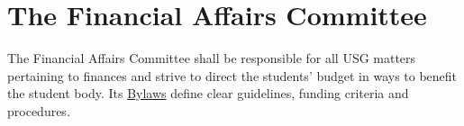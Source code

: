 \section{The Financial Affairs Committee}
\label{Financesdef}
The Financial Affairs Committee shall be responsible for all USG matters pertaining to finances and strive to direct the students' budget in ways to benefit the student body. Its \hyperref[FinByLawsdef]{Bylaws} define clear guidelines, funding criteria and procedures.

\section{}
\label{IACdef}


